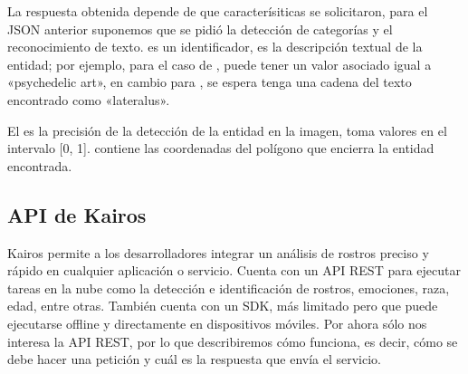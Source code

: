 \begin{sphinxVerbatim}[commandchars=\\\{\}]
   \PYG{p}{[}
         \PYG{p}{[}
             
             
             
        \PYG{p}{]}
         \PYG{p}{[}
               
               
               
               
                 \PYG{p}{[}
                     
                     
                \PYG{p}{]}
        \PYG{p}{]}
  \PYG{p}{]}
\end{sphinxVerbatim}

La respuesta obtenida depende de que caracterísiticas se solicitaron,
para el JSON anterior suponemos que se pidió la detección de
categorías y el reconocimiento de texto.  es un identificador,
 es la descripción textual de la entidad; por ejemplo,
para el caso de ,  puede tener un valor
asociado igual a «psychedelic art», en cambio para ,
se espera tenga una cadena del texto encontrado como «lateralus».

El  es la precisión de la detección de la entidad en la imagen,
toma valores en el intervalo {[}0, 1{]}.  contiene
las coordenadas del polígono que encierra la entidad encontrada.


\subsection{API de Kairos}
\label{\detokenize{chapter_one/apis_rest:api-de-kairos}}
Kairos permite a los desarrolladores integrar un análisis de rostros preciso
y rápido en cualquier aplicación o servicio. Cuenta con un API REST
para ejecutar tareas en la nube como la detección e identificación de rostros,
emociones, raza, edad, entre otras. También cuenta con un SDK, más limitado
pero que puede ejecutarse offline y directamente en dispositivos móviles.
Por ahora sólo nos interesa la API REST, por lo que describiremos cómo funciona,
es decir, cómo se debe hacer una petición y cuál es la respuesta
que envía el servicio.

